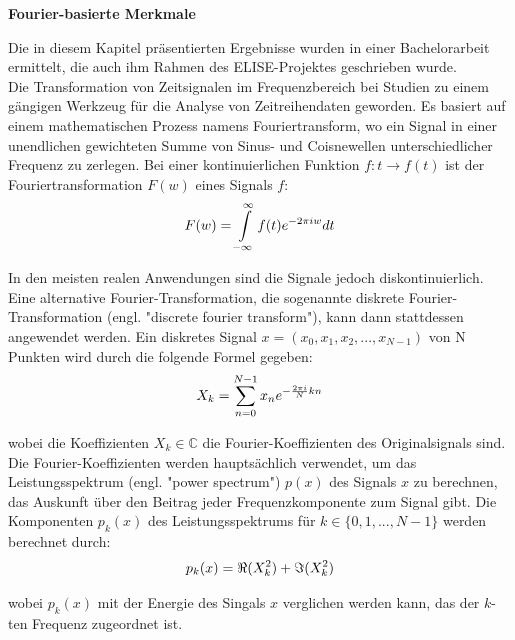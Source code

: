 \textbf{Fourier-basierte Merkmale \\}

Die in diesem Kapitel präsentierten Ergebnisse wurden in einer Bachelorarbeit \cite{bsclittau} ermittelt, die auch ihm Rahmen des ELISE-Projektes geschrieben wurde. \\

Die Transformation von Zeitsignalen im Frequenzbereich bei Studien zu einem gängigen Werkzeug für die Analyse von Zeitreihendaten geworden. Es basiert auf einem mathematischen Prozess namens Fouriertransform, wo ein Signal in einer unendlichen gewichteten Summe von Sinus- und Coisnewellen unterschiedlicher Frequenz zu zerlegen.
Bei einer kontinuierlichen Funktion $ f : t \rightarrow f(t) $ ist der Fouriertransformation $ F(w) $ eines Signals $ f $: 
\begin{equation} 
\Large{ F(w) = \int\limits_{-\infty}^{\infty}{f(t)e^{-2\pi{}iw}dt}} 
\label{equ:fourier} \end{equation}
\vspace{0.2cm}

In den meisten realen Anwendungen sind die Signale jedoch diskontinuierlich. 
Eine alternative Fourier-Transformation, die sogenannte diskrete Fourier-Transformation (engl. "discrete fourier transform"), kann dann stattdessen angewendet werden.
Ein diskretes Signal $ x = (x_{0},x_{1},x_{2},...,x_{N-1}) $ von N Punkten wird durch die folgende Formel gegeben:
\begin{equation} 
\Large{ X_{k} = \sum\limits_{n=0}^{N-1} x_{n} e^{- \frac{2 \pi i}{N} kn} } 
\end{equation} 
\vspace{0.2cm}

wobei die Koeffizienten $ X_{k} \in \mathbb{C} $ die Fourier-Koeffizienten des Originalsignals sind.
Die Fourier-Koeffizienten werden hauptsächlich verwendet, um das Leistungsspektrum (engl. "power spectrum") $ p(x) $ des Signals $x$ zu berechnen, das Auskunft über den Beitrag jeder Frequenzkomponente zum Signal gibt. 
Die Komponenten $ p_{k}(x) $ des Leistungsspektrums für $ k \in \lbrace 0,1,...,N-1 \rbrace$ werden berechnet durch: 
\begin{equation} 
\Large{ p_{k}(x) = \Re(X_{k}^{2})+\Im(X_{k}^{2}) } 
\end{equation} 

wobei $ p_{k}(x) $ mit der Energie des Singals $x$ verglichen werden kann, das der $k$-ten Frequenz zugeordnet ist. \\


